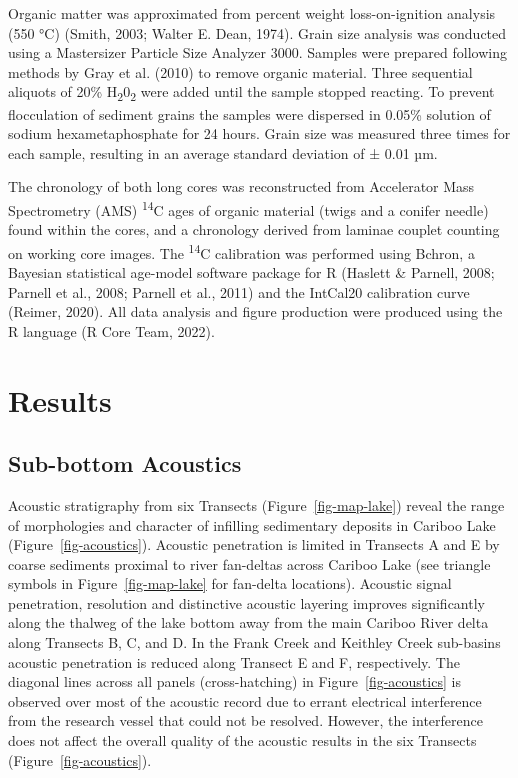 \documentclass[
  letterpaper,
  DIV=11,
  numbers=noendperiod]{scrartcl}
\begin{document}
Organic matter was approximated from percent weight loss-on-ignition
analysis (550 °C) (Smith, 2003; Walter E. Dean, 1974). Grain size
analysis was conducted using a Mastersizer Particle Size Analyzer 3000.
Samples were prepared following methods by Gray et al. (2010) to remove
organic material. Three sequential aliquots of 20\%
H\textsubscript{2}0\textsubscript{2} were added until the sample stopped
reacting. To prevent flocculation of sediment grains the samples were
dispersed in 0.05\% solution of sodium hexametaphosphate for 24 hours.
Grain size was measured three times for each sample, resulting in an
average standard deviation of ± 0.01 µm.

The chronology of both long cores was reconstructed from Accelerator
Mass Spectrometry (AMS) \textsuperscript{14}C ages of organic material
(twigs and a conifer needle) found within the cores, and a chronology
derived from laminae couplet counting on working core images. The
\textsuperscript{14}C calibration was performed using Bchron, a Bayesian
statistical age-model software package for R (Haslett \& Parnell, 2008;
Parnell et al., 2008; Parnell et al., 2011) and the IntCal20 calibration
curve (Reimer, 2020). All data analysis and figure production were
produced using the R language (R Core Team, 2022).

\hypertarget{results}{%
\section{Results}\label{results}}

\hypertarget{sub-bottom-acoustics}{%
\subsection{Sub-bottom Acoustics}\label{sub-bottom-acoustics}}

Acoustic stratigraphy from six Transects (Figure~\ref{fig-map-lake})
reveal the range of morphologies and character of infilling sedimentary
deposits in Cariboo Lake (Figure~\ref{fig-acoustics}). Acoustic
penetration is limited in Transects A and E by coarse sediments proximal
to river fan-deltas across Cariboo Lake (see triangle symbols in
Figure~\ref{fig-map-lake} for fan-delta locations). Acoustic signal
penetration, resolution and distinctive acoustic layering improves
significantly along the thalweg of the lake bottom away from the main
Cariboo River delta along Transects B, C, and D. In the Frank Creek and
Keithley Creek sub-basins acoustic penetration is reduced along Transect
E and F, respectively. The diagonal lines across all panels
(cross-hatching) in Figure~\ref{fig-acoustics} is observed over most of
the acoustic record due to errant electrical interference from the
research vessel that could not be resolved. However, the interference
does not affect the overall quality of the acoustic results in the six
Transects (Figure~\ref{fig-acoustics}).
\end{document}
